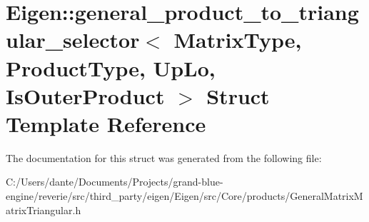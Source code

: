 \hypertarget{struct_eigen_1_1general__product__to__triangular__selector}{}\section{Eigen\+::general\+\_\+product\+\_\+to\+\_\+triangular\+\_\+selector$<$ Matrix\+Type, Product\+Type, Up\+Lo, Is\+Outer\+Product $>$ Struct Template Reference}
\label{struct_eigen_1_1general__product__to__triangular__selector}


The documentation for this struct was generated from the following file\+:\begin{DoxyCompactItemize}
\item 
C\+:/\+Users/dante/\+Documents/\+Projects/grand-\/blue-\/engine/reverie/src/third\+\_\+party/eigen/\+Eigen/src/\+Core/products/General\+Matrix\+Matrix\+Triangular.\+h\end{DoxyCompactItemize}
